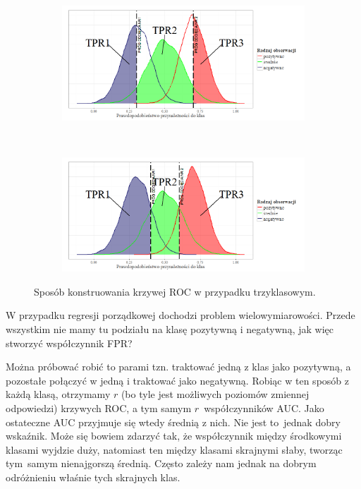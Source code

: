\documentclass{mini}
\begin{document}
\begin{figure}[h]
	\begin{center}
  \begin{subfigure}[h]{\textwidth}
    \includegraphics[width=\textwidth]{graphics/roc_trzy1.png}
  \end{subfigure}\\
  \begin{subfigure}[h]{\textwidth}
    \includegraphics[width=\textwidth]{graphics/roc_trzy2.png}
  \end{subfigure}
  \end{center}
  \caption{Sposób konstruowania krzywej ROC w przypadku trzyklasowym.}
  \label{trzyklasowy}
\end{figure}

W przypadku regresji porządkowej dochodzi problem wielowymiarowości. Przede wszystkim nie mamy tu podziału na klasę pozytywną i negatywną, jak więc stworzyć współczynnik FPR? 

Można próbować robić to parami tzn. traktować jedną z klas jako pozytywną, a pozostałe połączyć w jedną i traktować jako negatywną. Robiąc w ten sposób z każdą klasą, otrzymamy $r$ (bo tyle jest możliwych poziomów zmiennej odpowiedzi) krzywych ROC, a tym samym $r$~współczynników AUC. Jako ostateczne AUC przyjmuje się wtedy średnią z nich. Nie jest to~jednak dobry wskaźnik. Może się bowiem zdarzyć tak, że współczynnik między środkowymi klasami wyjdzie duży, natomiast ten między klasami skrajnymi słaby, tworząc tym~samym nienajgorszą średnią. Często zależy nam jednak na dobrym odróżnieniu właśnie tych skrajnych klas. 
\end{document}
